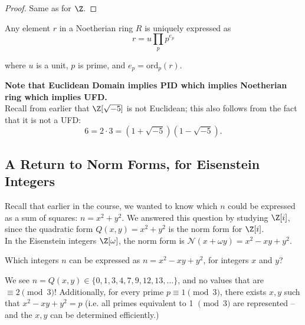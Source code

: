 \documentclass[11pt]{article}
\begin{document}
\begin{proof}
Same as for $\Z$.
\end{proof}


\begin{theorem}
Any element $r$ in a Noetherian ring $R$ is uniquely expressed as 
\[
    r = u \prod_p p^{e_{p}}
\]

where $u$ is a unit, $p$ is prime, and $e_p = \mathrm{ord}_p(r).$ 
\end{theorem}

\begin{remark}
\textbf{Note that Euclidean Domain implies PID which implies Noetherian ring which implies UFD.} \\

Recall from earlier that $\Z[\sqrt{-5}]$ is not Euclidean; this also follows from the fact that it is not a UFD: 
\[
    6 = 2 \cdot 3 = (1+\sqrt{-5})(1-\sqrt{-5}).
\]
\end{remark}

\subsection{A Return to Norm Forms, for Eisenstein Integers}

Recall that earlier in the course, we wanted to know which $n$ could be expressed as a sum of squares: $n = x^2 + y^2$.
We answered this question by studying $\Z[i]$, since the quadratic form $Q(x, y) = x^2 + y^2$ is the norm form for $\Z[i]$. \\

In the Eisenstein integers $\Z[\omega]$, the norm form is $\mathcal{N}(x+\omega y) = x^2 - xy + y^2$.

\begin{exercise}
Which integers $n$ can be expressed as $n = x^2 - xy + y^2$, for integers $x$ and $y$?    
\end{exercise}

\begin{answer}
We see $n = Q(x, y) \in \{0, 1, 3, 4, 7, 9, 12, 13, \dots\}$, and no values that are $\equiv 2 \pmod 3$! 
Additionally, for every prime $p \equiv 1 \pmod{3}$, there exists $x, y$ such that $x^2 - xy + y^2 = p$ (i.e. all primes equivalent to 1 $\pmod 3$ are represented 
-- and the $x, y$ can be determined efficiently.)    
\end{answer}
\end{document}
